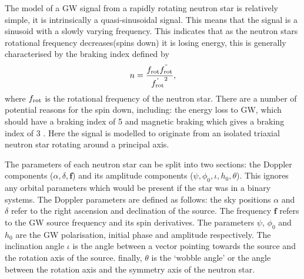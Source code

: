 The model of a \gls{GW} signal from a rapidly rotating neutron star is relatively simple, it is intrinsically a
quasi-sinusoidal signal. This means that the signal is a sinusoid with a slowly
varying frequency. This indicates that as the neutron stars rotational frequency decreases(spins down) it is losing energy, this is generally characterised by the braking index defined by
\begin{equation}
	n = \frac{f_{\rm{rot}} \ddot{f_{\rm{rot}}}}{\dot{f_{\rm{rot}}}^2},
\end{equation}
where $f_{\rm{rot}}$ is the rotational frequency of the neutron star.
There are a number of potential reasons for the spin down, including: the energy loss to \gls{GW}, which should have a braking index of 5 \citep{dearaujo2016GravitationalWaves} and magnetic braking which gives a braking index of 3 \citep{dearaujo2016GravitationalWaves}.
Here the signal is modelled to
originate from an isolated triaxial neutron star rotating around a principal
axis.

The parameters of each neutron star can be split into two sections: the Doppler components
($\alpha,\delta,{\bm f}$) and its amplitude components ($\psi,\phi_0, \iota,
h_0, \theta$). This ignores any orbital parameters which would be present if the
star was in a binary systems. The Doppler parameters are defined as follows: the sky positions
$\alpha$ and $\delta$ refer to the right ascension and declination of the source. The frequency ${\bm f}$ refers to
the \gls{GW} source frequency and its spin derivatives.  The parameters $\psi$,
$\phi_0$ and $h_0 $ are the \gls{GW} polarisation, initial phase and amplitude
respectively.  The inclination angle $\iota$ is the angle between a vector pointing towards the source and the rotation axis of the source. 
finally, $\theta$ is the `wobble angle' or the angle between the rotation axis and the
symmetry axis of the neutron star.

